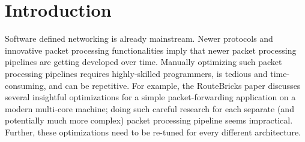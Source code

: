 \section{Introduction}

Software defined networking is already mainstream. Newer protocols and innovative packet
processing functionalities imply that
newer packet processing pipelines are getting developed over time. Manually
optimizing such packet processing pipelines requires highly-skilled programmers, is tedious
and time-consuming, and can be repetitive.
For example, the RouteBricks paper \cite{dobrescu2009routebricks} discusses several insightful optimizations
for a simple packet-forwarding application on a modern multi-core machine; doing such careful
research for each separate (and potentially much more complex) packet processing pipeline
seems impractical. Further, these optimizations need to be re-tuned for every different
architecture.


